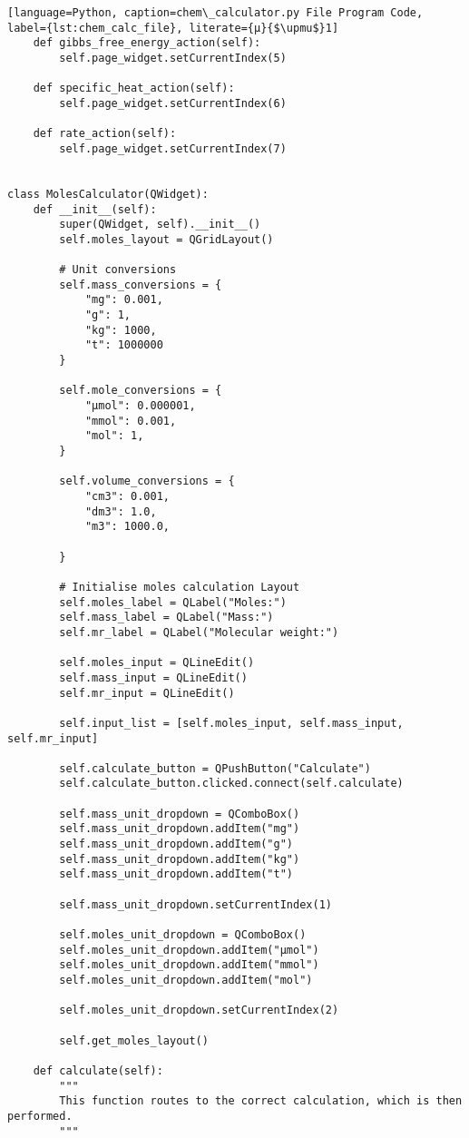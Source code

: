 \begin{lstlisting}[language=Python, caption=chem\_calculator.py File Program Code, label={lst:chem_calc_file}, literate={μ}{$\upmu$}1]
    def gibbs_free_energy_action(self):
        self.page_widget.setCurrentIndex(5)

    def specific_heat_action(self):
        self.page_widget.setCurrentIndex(6)

    def rate_action(self):
        self.page_widget.setCurrentIndex(7)


class MolesCalculator(QWidget):
    def __init__(self):
        super(QWidget, self).__init__()
        self.moles_layout = QGridLayout()

        # Unit conversions
        self.mass_conversions = {
            "mg": 0.001,
            "g": 1,
            "kg": 1000,
            "t": 1000000
        }

        self.mole_conversions = {
            "μmol": 0.000001,
            "mmol": 0.001,
            "mol": 1,
        }

        self.volume_conversions = {
            "cm3": 0.001,
            "dm3": 1.0,
            "m3": 1000.0,

        }

        # Initialise moles calculation Layout
        self.moles_label = QLabel("Moles:")
        self.mass_label = QLabel("Mass:")
        self.mr_label = QLabel("Molecular weight:")

        self.moles_input = QLineEdit()
        self.mass_input = QLineEdit()
        self.mr_input = QLineEdit()

        self.input_list = [self.moles_input, self.mass_input, self.mr_input]

        self.calculate_button = QPushButton("Calculate")
        self.calculate_button.clicked.connect(self.calculate)

        self.mass_unit_dropdown = QComboBox()
        self.mass_unit_dropdown.addItem("mg")
        self.mass_unit_dropdown.addItem("g")
        self.mass_unit_dropdown.addItem("kg")
        self.mass_unit_dropdown.addItem("t")

        self.mass_unit_dropdown.setCurrentIndex(1)

        self.moles_unit_dropdown = QComboBox()
        self.moles_unit_dropdown.addItem("μmol")
        self.moles_unit_dropdown.addItem("mmol")
        self.moles_unit_dropdown.addItem("mol")

        self.moles_unit_dropdown.setCurrentIndex(2)

        self.get_moles_layout()

    def calculate(self):
        """
        This function routes to the correct calculation, which is then performed.
        """


\end{lstlisting}
